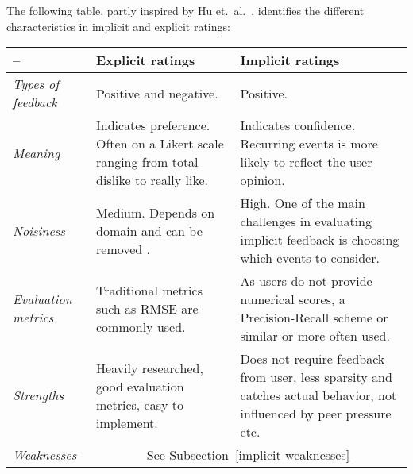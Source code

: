 The following table, partly inspired by Hu et.\ al.~\cite{Hu2008}, identifies
the different characteristics in implicit and explicit ratings:

\begin{table}[H]
    \begin{tabular}{l p{6cm} p{6cm}}
    \toprule
    –                  & \textbf{Explicit ratings}
                       & \textbf{Implicit ratings} \\ \midrule

    \textit{Types of feedback}
                       & Positive and negative.
                       & Positive. \\ \midrule

    \textit{Meaning}
                       & Indicates preference. Often on a Likert scale ranging
                         from total dislike to really like.
                       & Indicates confidence. Recurring events is more likely
                         to reflect the user opinion.
                         \\ \midrule

    \textit{Noisiness}
                       & Medium. Depends on domain and can be removed
                         \cite{amatriain2009like}.
                       & High. One of the main challenges in evaluating
                         implicit feedback is choosing which events to
                         consider. \\ \midrule

    \textit{Evaluation metrics}
                       & Traditional metrics such as RMSE are commonly used.
                       & As users do not provide numerical scores, a
                         Precision-Recall scheme or similar or more often used.
                         \\ \midrule

    \textit{Strengths}
                       & Heavily researched, good evaluation metrics, easy to
                         implement.
                       & Does not require feedback from user, less sparsity and
                         catches actual behavior, not influenced by peer
                         pressure etc. \\ \midrule

    \textit{Weaknesses}
                       & \multicolumn{2}{c}{See Subsection~\ref{implicit-weaknesses}} \\
    \bottomrule
    \end{tabular}
\end{table}

